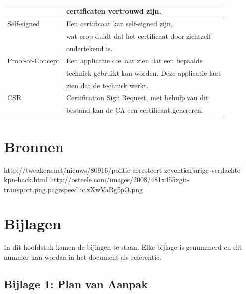 \documentclass[]{article}
\begin{document}
\begin{longtable}{|| l | l ||}
                     & certificaten vertrouwd  zijn.                        \\\hline
    Self-signed      & Een certificaat kan self-signed zijn,                \\
                     & wat erop duidt dat het certificaat door zichtzelf    \\
                     & ondertekend is.                                      \\\hline
    Proof-of-Concept & Een applicatie die laat zien dat een bepaalde        \\
                     & techniek gebruikt kan worden. Deze applicatie laat   \\
                     & zien dat de techniek werkt.                   \\\hline
    CSR              & Certification Sign Request, met behulp van dit       \\
                     & bestand kan de CA een certificaat genereren.         \\\hline
\end{longtable}

\newpage
\section{Bronnen}

http://tweakers.net/nieuws/80916/politie-arresteert-zeventienjarige-verdachte-kpn-hack.html
http://osteele.com/images/2008/481x455xgit-transport.png.pagespeed.ic.zXwVaRg5pO.png

\newpage
\section{Bijlagen}

In dit hoofdstuk komen de bijlagen te staan. Elke bijlage is genummerd en
dit nummer kan worden in het document als referentie.

\subsection{Bijlage 1: Plan van Aanpak}

\newpage
\end{document}
